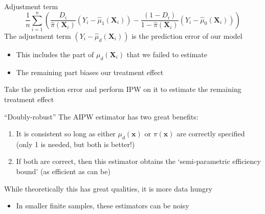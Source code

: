 \documentclass[aspectratio=169,t,11pt,table]{beamer}
\begin{document}
\begin{frame}{Adjustment term}
  \vspace*{-\bigskipamount}
  $$
    \frac{1}{n} \sum_{i=1}^n \left( 
      \frac{D_i}{\hat{\pi}(\bm{X}_i)} (Y_i - \hat{\mu}_{1}(\bm{X}_i)) -
      \frac{(1 - D_i)}{1 - \hat{\pi}(\bm{X}_i)} (Y_i - \hat{\mu}_{0}(\bm{X}_i)) 
    \right) 
  $$
  The adjustment term $(Y_i - \hat{\mu}_d(\bm{X}_i))$ is the prediction error of our model
  \begin{itemize}
    \item This includes the part of $\mu_d(\bm{X}_i)$ that we failed to estimate
    \item The remaining part biases our treatment effect
  \end{itemize}
  
  Take the prediction error and perform IPW on it to estimate the remaining treatment effect
\end{frame}

\begin{frame}{``Doubly-robust''}
  The AIPW estimator has two great benefits:
  \begin{enumerate}
    \item It is consistent so long as either $\mu_d(\bm{x})$ or $\pi(\bm{x})$ are correctly specified (only 1 is needed, but both is better!)
    
    \pause
    \item If both are correct, then this estimator obtains the `semi-parametric efficiency bound' (as efficient as can be)
  \end{enumerate}

  \pause
  \bigskip
  While theoretically this has great qualities, it is more data hungry
  \begin{itemize}
    \item In smaller finite samples, these estimators can be noisy
  \end{itemize}
\end{frame}
\end{document}
